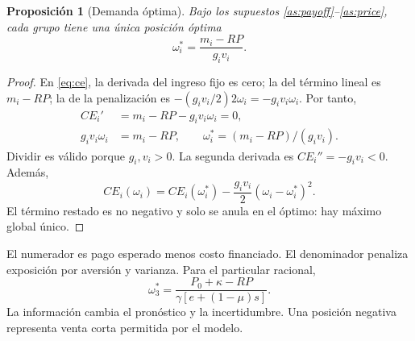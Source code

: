 \documentclass[11pt]{article}
\newtheorem{proposition}{Proposición}
\begin{document}
\begin{proposition}[Demanda óptima]\label{prop:demand}
Bajo los supuestos \ref{as:payoff}--\ref{as:price}, cada grupo tiene una
única posición óptima
\begin{equation}\label{eq:demand}
 \omega_i^*=\frac{m_i-RP}{g_iv_i}.
\end{equation}
\end{proposition}
\begin{proof}
En \eqref{eq:ce}, la derivada del ingreso fijo es cero; la del término
lineal es $m_i-RP$; la de la penalización es
$-(g_iv_i/2)2\omega_i=-g_iv_i\omega_i$. Por tanto,
\begin{align}
 CE_i'&=m_i-RP-g_iv_i\omega_i=0,\\
 g_iv_i\omega_i&=m_i-RP,\qquad
 \omega_i^*=(m_i-RP)/(g_iv_i).
\end{align}
Dividir es válido porque $g_i,v_i>0$. La segunda derivada es
$CE_i''=-g_iv_i<0$. Además,
\begin{equation}\label{eq:square}
 CE_i(\omega_i)=CE_i(\omega_i^*)-
 \frac{g_iv_i}{2}(\omega_i-\omega_i^*)^2.
\end{equation}
El término restado es no negativo y solo se anula en el óptimo:
hay máximo global único.
\end{proof}
El numerador es pago esperado menos costo financiado. El denominador
penaliza exposición por aversión y varianza. Para el particular racional,
\begin{equation}
 \omega_3^*=\frac{P_0+\kappa-RP}{\gamma[e+(1-\mu)s]}.
\end{equation}
La información cambia el pronóstico y la incertidumbre. Una posición
negativa representa venta corta permitida por el modelo.
\end{document}
